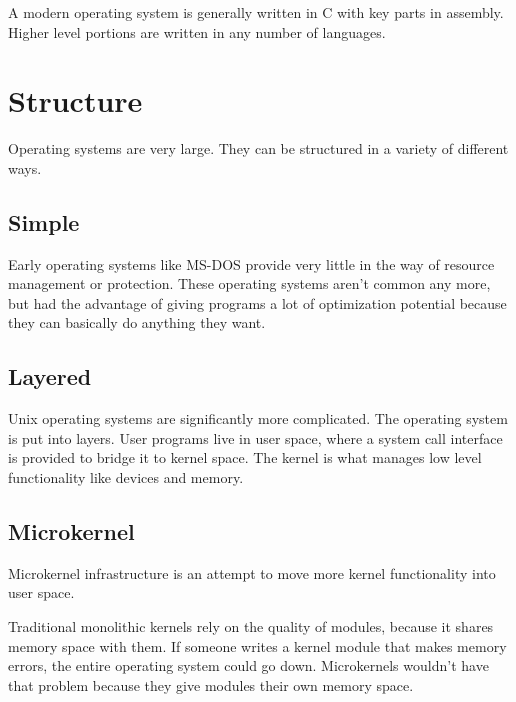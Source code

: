 \documentclass{article}
\begin{document}
A modern operating system is generally written in C with key parts in assembly.
Higher level portions are written in any number of languages.

\section{Structure}
Operating systems are very large. They can be structured in a variety of
different ways.

\subsection{Simple}
Early operating systems like MS-DOS provide very little in the way of resource
management or protection. These operating systems aren't common any more, but
had the advantage of giving programs a lot of optimization potential because
they can basically do anything they want.

\subsection{Layered}
Unix operating systems are significantly more complicated. The operating system
is put into layers. User programs live in user space, where a system call
interface is provided to bridge it to kernel space. The kernel is what manages
low level functionality like devices and memory.

\subsection{Microkernel}
Microkernel infrastructure is an attempt to move more kernel functionality into
user space.

Traditional monolithic kernels rely on the quality of modules,
because it shares memory space with them. If someone writes a kernel module
that makes memory errors, the entire operating system could go down.
Microkernels wouldn't have that problem because they give modules their own
memory space.
\end{document}
